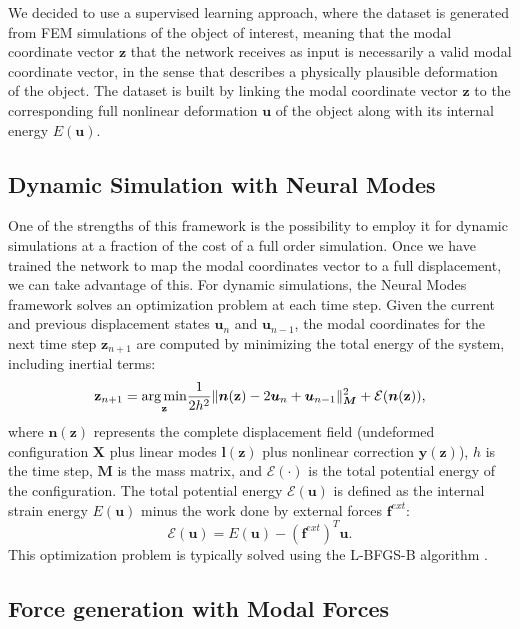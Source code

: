 We decided to use a supervised learning approach, where the dataset is generated from FEM simulations of the object of interest, meaning that the modal coordinate vector \( \mathbf{z} \) that the network receives as input is necessarily a valid modal coordinate vector, in the sense that describes a physically plausible deformation of the object. The dataset is built by linking the modal coordinate vector \( \mathbf{z} \) to the corresponding full nonlinear deformation \( \bm{u} \) of the object along with its internal energy \( E(\bm{u}) \). 

\subsection{Dynamic Simulation with Neural Modes}
\label{sec:subspace_dynamics}
One of the strengths of this framework is the possibility to employ it for dynamic simulations at a fraction of the cost of a full order simulation. Once we have trained the network to map the modal coordinates vector to a full displacement, we can take advantage of this.
For dynamic simulations, the Neural Modes framework solves an optimization problem at each time step. Given the current and previous displacement states $\bm{u}_n$ and $\bm{u}_{n-1}$, the modal coordinates for the next time step $\mathbf{z}_{n+1}$ are computed by minimizing the total energy of the system, including inertial terms:
\begin{equation}
    \mathbf{z}_{n+1} = \underset{\mathbf{z}}{\operatorname*{arg\,min}} \frac{1}{2h^2} \|\bm{n}(\mathbf{z}) - 2\bm{u}_n + \bm{u}_{n-1}\|_{\bm{M}}^2 + \mathcal{E}(\bm{n}(\mathbf{z})),
    \label{eq:optimization_problem}
\end{equation}
where $\bm{n}(\mathbf{z})$ represents the complete displacement field (undeformed configuration $\bm{X}$ plus linear modes $\bm{l}(\mathbf{z})$ plus nonlinear correction $\bm{y}(\mathbf{z})$), $h$ is the time step, $\bm{M}$ is the mass matrix, and $\mathcal{E}(\cdot)$ is the total potential energy of the configuration. The total potential energy $\mathcal{E}(\bm{u})$ is defined as the internal strain energy $E(\bm{u})$ minus the work done by external forces $\bm{f}^{ext}$:
\[\mathcal{E}(\bm{u}) = E(\bm{u}) - (\bm{f}^{ext})^T \bm{u}.\]
 This optimization problem is typically solved using the L-BFGS-B algorithm \cite{Liu_1989}.






\subsection{Force generation with Modal Forces}
\label{sec:modal_forces}


